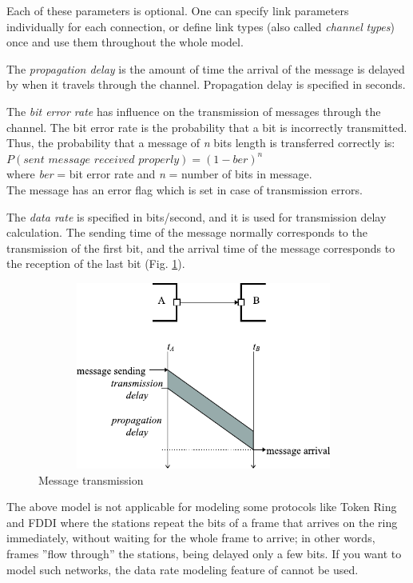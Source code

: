 Each of these parameters is optional. One can specify link parameters
individually for each connection, or define link types (also
called \textit{channel} \textit{types}) once and use them throughout the
whole model.

The \textit{propagation delay} is the amount of time the arrival of
the message is delayed by when it travels through the channel.
Propagation delay is specified in seconds.

The \textit{bit error rate} has influence on the transmission of messages
through the channel. The bit error rate is the probability that
a bit is incorrectly transmitted. Thus, the probability that
a message of \textit{n} bits length is transferred correctly is:\\


$P( \textit{sent message received properly} ) = (1 - \textit{ber})^{\mathit{n}}$\\
where \textit{ber} = bit error rate and \textit{n} = number of bits in message.\\


The message has an error flag which is set in case of transmission
errors.

The \textit{data rate} is specified in bits/second, and it is used
for transmission delay calculation. The sending time of the message
normally corresponds to the transmission of the first bit, and
the arrival time of the message corresponds to the reception
of the last bit (Fig. \ref{fig:ch-overview:message-transm}).

\begin{figure}[htbp]
\begin{center}
\includegraphics[width=4.301in, height=2.417in]{figures/usmanFig4}
\caption{Message transmission}
\label{fig:ch-overview:message-transm}
\end{center}
\end{figure}

The above model is not applicable for modeling some protocols like
Token Ring and FDDI where the stations repeat the bits of a frame that
arrives on the ring immediately, without waiting for the whole frame
to arrive; in other words, frames ''flow through'' the stations, being
delayed only a few bits. If you want to model such networks, the data
rate modeling feature of {\opp} cannot be used.

